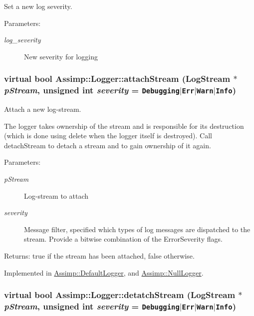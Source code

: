 Set a new log severity. 

\begin{Desc}
\item[Parameters:]
\begin{description}
\item[{\em log\_\-severity}]New severity for logging \end{description}
\end{Desc}
\hypertarget{class_assimp_1_1_logger_af32a42b02a7e227076013d01e349871}{
\subsubsection[attachStream]{\setlength{\rightskip}{0pt plus 5cm}virtual bool Assimp::Logger::attachStream ({\bf LogStream} $\ast$ {\em pStream}, \/  unsigned int {\em severity} = {\tt Debugging$|$Err$|$Warn$|$Info})}}
\label{class_assimp_1_1_logger_af32a42b02a7e227076013d01e349871}


Attach a new log-stream. 

The logger takes ownership of the stream and is responsible for its destruction (which is done using delete when the logger itself is destroyed). Call detachStream to detach a stream and to gain ownership of it again. \begin{Desc}
\item[Parameters:]
\begin{description}
\item[{\em pStream}]Log-stream to attach \item[{\em severity}]Message filter, specified which types of log messages are dispatched to the stream. Provide a bitwise combination of the ErrorSeverity flags. \end{description}
\end{Desc}
\begin{Desc}
\item[Returns:]true if the stream has been attached, false otherwise. \end{Desc}


Implemented in \hyperlink{class_assimp_1_1_default_logger_bc0ca7a337f8c3e38eca0eb45bb1ccf0}{Assimp::DefaultLogger}, and \hyperlink{class_assimp_1_1_null_logger_31c05ecaee392b5fd34fd2dfd1cca559}{Assimp::NullLogger}.\hypertarget{class_assimp_1_1_logger_9489263727f29fecbd705d5c8d2590c0}{
\subsubsection[detatchStream]{\setlength{\rightskip}{0pt plus 5cm}virtual bool Assimp::Logger::detatchStream ({\bf LogStream} $\ast$ {\em pStream}, \/  unsigned int {\em severity} = {\tt Debugging$|$Err$|$Warn$|$Info})}}
\label{class_assimp_1_1_logger_9489263727f29fecbd705d5c8d2590c0}


